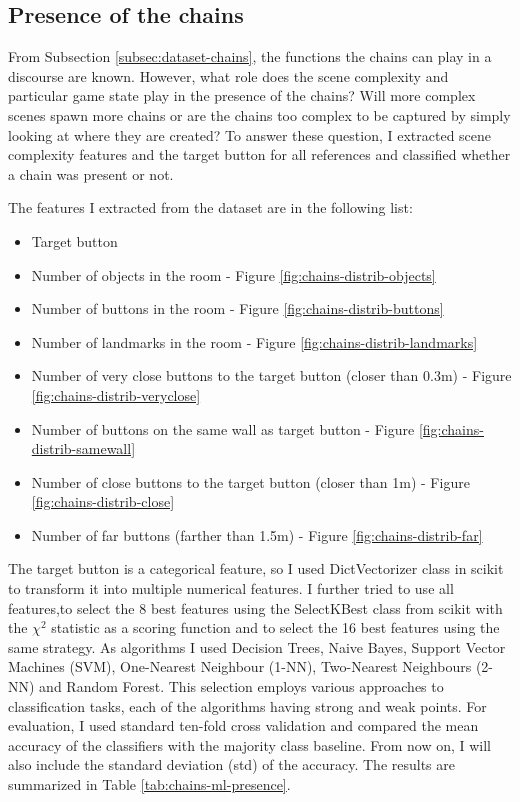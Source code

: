 \subsection{Presence of the chains}
From Subsection \ref{subsec:dataset-chains}, the functions the chains can play in a discourse are known. However, what role does the scene complexity and particular game state play in the presence of the chains? Will more complex scenes spawn more chains or are the chains too complex to be captured by simply looking at where they are created? To answer these question, I extracted scene complexity features and the target button for all references and classified whether a chain was present or not.

The features I extracted from the dataset are in the following list:

\begin{itemize}
\item
Target button	
\item
Number of objects in the room - Figure \ref{fig:chains-distrib-objects}
\item
Number of buttons in the room - Figure \ref{fig:chains-distrib-buttons}
\item
Number of landmarks in the room - Figure \ref{fig:chains-distrib-landmarks}
\item
Number of very close buttons to the target button (closer than 0.3m) - Figure \ref{fig:chains-distrib-veryclose}
\item
Number of buttons on the same wall as target button - Figure \ref{fig:chains-distrib-samewall}
\item
Number of close buttons to the target button (closer than 1m) - Figure \ref{fig:chains-distrib-close}
\item
Number of far buttons (farther than 1.5m) - Figure \ref{fig:chains-distrib-far}
\end{itemize}

The target button is a categorical feature, so I used DictVectorizer class in scikit to transform it into multiple numerical features. I further tried to use all features,to  select the 8 best features using the SelectKBest class from scikit with the $\chi^2$ statistic as a scoring function and to select the 16 best features using the same strategy. As algorithms I used Decision Trees, Naive Bayes, Support Vector Machines (SVM), One-Nearest Neighbour (1-NN), Two-Nearest Neighbours (2-NN) and Random Forest. This selection employs various approaches to classification tasks, each of the algorithms having strong and weak points. For evaluation, I used standard ten-fold cross validation and compared the mean accuracy of the classifiers with the majority class baseline. From now on, I will also include the standard deviation (std) of the accuracy. The results are summarized in Table \ref{tab:chains-ml-presence}. 

